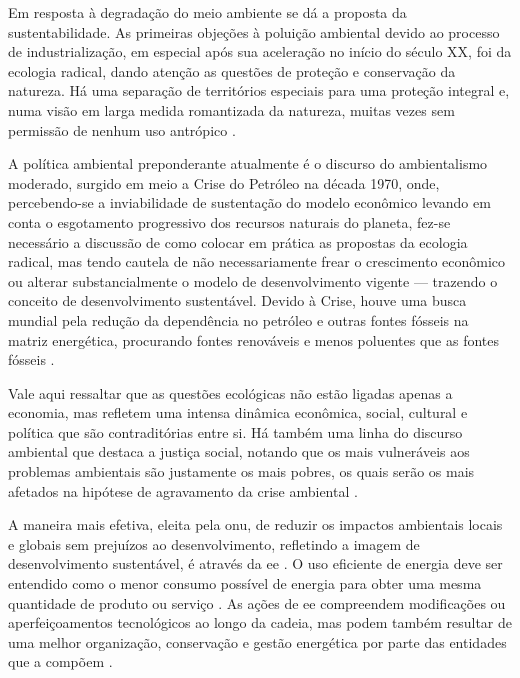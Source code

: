 Em resposta à degradação do meio ambiente se dá a proposta da
sustentabilidade. As primeiras objeções à poluição ambiental devido ao
processo de industrialização, em especial após sua aceleração no
início do século XX, foi da ecologia radical, dando atenção as
questões de proteção e conservação da natureza.  Há uma separação de
territórios especiais para uma proteção integral e, numa visão em
larga medida romantizada da natureza, muitas vezes sem permissão de
nenhum uso antrópico \cite{jatoba}.

A política ambiental preponderante atualmente é o discurso do
ambientalismo moderado, surgido em meio a Crise do Petróleo na década
1970, onde, percebendo-se a inviabilidade de sustentação do modelo
econômico levando em conta o esgotamento progressivo dos recursos
naturais do planeta, fez-se necessário a discussão de como colocar em
prática as propostas da ecologia radical, mas tendo cautela de não
necessariamente frear o crescimento econômico ou alterar
substancialmente o modelo de desenvolvimento vigente --- trazendo o
conceito de desenvolvimento sustentável. Devido à Crise, houve uma
busca mundial pela redução da dependência no petróleo e outras fontes
fósseis na matriz energética, procurando fontes renováveis e menos
poluentes que as fontes fósseis
\cite{jatoba,epe_eficiencia_2012,rippel}.

Vale aqui ressaltar que as questões ecológicas não estão ligadas
apenas a economia, mas refletem uma intensa dinâmica econômica,
social, cultural e política que são contraditórias entre si. Há também
uma linha do discurso ambiental que destaca a justiça social, notando
que os mais vulneráveis aos problemas ambientais são justamente os
mais pobres, os quais serão os mais afetados na hipótese de
agravamento da crise ambiental \cite{jatoba}.

A maneira mais efetiva, eleita pela \gls{onu}, de reduzir os impactos
ambientais locais e globais sem prejuízos ao desenvolvimento,
refletindo a imagem de desenvolvimento sustentável, é através da
\gls{ee} \cite{rippel,onu,dissert_cursino}. O uso eficiente de energia
deve ser entendido como o menor consumo possível de energia para obter
uma mesma quantidade de produto ou serviço \cite{pne30_eff_energ}.  As
ações de \gls{ee} compreendem modificações ou aperfeiçoamentos
tecnológicos ao longo da cadeia, mas podem também resultar de uma
melhor organização, conservação e gestão energética por parte das
entidades que a compõem \cite{pnef}.

